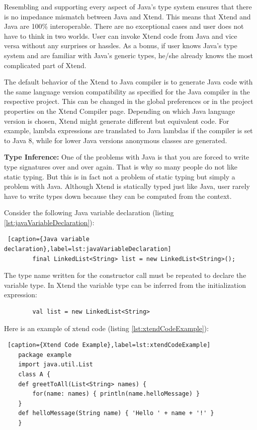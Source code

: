 	Resembling and supporting every aspect of Java's type system ensures that there is no impedance mismatch between Java and Xtend. This means that Xtend and Java are 100\% interoperable. There are no exceptional cases and user does not have to think in two worlds. User can invoke Xtend code from Java and vice versa without any surprises or hassles. As a bonus, if user knows Java's type system and are familiar with Java's generic types, he/she already knows the most complicated part of Xtend.
	
	The default behavior of the Xtend to Java compiler is to generate Java code with the same language version compatibility as specified for the Java compiler in the respective project. This can be changed in the global preferences or in the project properties on the Xtend  Compiler page. Depending on which Java language version is chosen, Xtend might generate different but equivalent code. For example, lambda expressions are translated to Java lambdas if the compiler is set to Java 8, while for lower Java versions anonymous classes are generated.
	
	\textbf{Type Inference:}
	One of the problems with Java is that you are forced to write type signatures over and over again. That is why so many people do not like static typing. But this is in fact not a problem of static typing but simply a problem with Java. Although Xtend is statically typed just like Java, user rarely have to write types down because they can be computed from the context.
	
	Consider the following Java variable declaration (listing \ref{lst:javaVariableDeclaration}):
	\begin{lstlisting} [caption={Java variable declaration},label=lst:javaVariableDeclaration]
		final LinkedList<String> list = new LinkedList<String>();
	\end{lstlisting}
	The type name written for the constructor call must be repeated to declare the variable type. In Xtend the variable type can be inferred from the initialization expression:
	\begin{lstlisting}
		val list = new LinkedList<String>
	\end{lstlisting}		
	Here is an example of xtend code (listing \ref{lst:xtendCodeExample}):
	\begin{lstlisting} [caption={Xtend Code Example},label=lst:xtendCodeExample]
	package example	
	import java.util.List		
	class A {
	def greetToAll(List<String> names) {
		for(name: names) { println(name.helloMessage) }
	}		
	def helloMessage(String name) { 'Hello ' + name + '!' }
	}
	
	\end{lstlisting} 
	   
